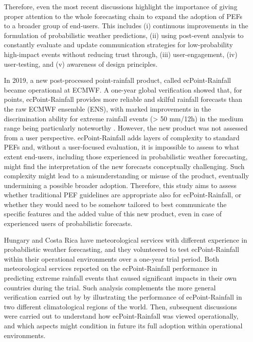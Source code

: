 \documentclass[twocol]{ametsocV5} %
\begin{document}
Therefore, even the most recent discussions \citep{Zhang2019}  highlight the importance of giving proper attention to the whole forecasting chain to expand the adoption of PEFs to a broader group of end-users. This includes (i) continuous improvements in the formulation of probabilistic weather predictions, (ii) using post-event analysis to constantly evaluate and update communication strategies for low-probability high-impact events without reducing trust through, (iii) user-engagement, (iv) user-testing, and (v) awareness of design principles. \par
In 2019, a new post-processed point-rainfall product, called ecPoint-Rainfall became operational at ECMWF. A one-year global verification showed that, for points, ecPoint-Rainfall provides more reliable and skilful rainfall forecasts than the raw ECMWF ensemble (ENS), with marked improvements in the discrimination ability for extreme rainfall events (> 50 mm/12h) in the medium range being particularly noteworthy \citep{Hewson2020a}. However, the new product was not assessed from a user perspective. ecPoint-Rainfall adds layers of complexity to standard PEFs and, without a user-focused evaluation, it is impossible to assess to what extent end-users, including those experienced in probabilistic weather forecasting, might find the interpretation of the new forecasts conceptually challenging. Such complexity might lead to a misunderstanding or misuse of the product, eventually undermining a possible broader adoption. Therefore, this study aims to assess whether traditional PEF guidelines are appropriate also for ecPoint-Rainfall, or whether they would need to be somehow tailored to best communicate the specific features and the added value of this new product, even in case of experienced users of probabilistic forecasts. \par
Hungary and Costa Rica have meteorological services with different experience in probabilistic weather forecasting, and they volunteered to test ecPoint-Rainfall within their operational environments over a one-year trial period. Both  meteorological services reported on the ecPoint-Rainfall performance in predicting extreme rainfall events that caused significant impacts in their own countries during the trial. Such analysis complements the more general verification carried out by \citet{Hewson2020a} by illustrating the performance of ecPoint-Rainfall in two different climatological regions of the world. Then, subsequent discussions were carried out to understand how ecPoint-Rainfall was viewed  operationally, and which aspects might condition in future its full adoption within operational environments. \par
\end{document}
